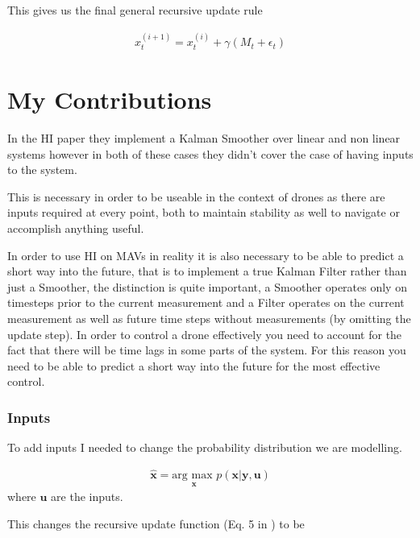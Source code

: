 \documentclass[]{../resources/final_report}
\begin{document}
This gives us the final general recursive update rule

\begin{align}
  x_t^{(i+1)} = x_t^{(i)} + \gamma (M_t + \epsilon_t)
\end{align}


\section{My Contributions}


In the HI paper they implement a Kalman Smoother over linear and non linear systems however in both of these cases
they didn't cover the case of having inputs to the system. 

This is necessary in order to be useable in the context of drones as there are inputs required at 
every point, both to maintain stability as well to navigate or accomplish anything useful.

In order to use HI on MAVs in reality it is also necessary to be able to predict a short way 
into the future, that is to implement a true Kalman Filter rather than just a Smoother, the distinction
is quite important, a Smoother operates only on timesteps prior to the current measurement and a Filter 
operates on the current measurement as well as future time steps without measurements (by omitting the update step). 
In order to control a drone effectively you need to account for the fact that there will be time lags in some 
parts of the system. For this reason you need to be able to predict a short way into the future for the most effective control.


\subsubsection{Inputs}

To add inputs I needed to change the probability distribution we are modelling.

\begin{align}
  \hat{\textbf{x}} = \underset{\textbf{x}}{\text{arg max }} p(\textbf{x} | \textbf{y}, \textbf{u}) 
\end{align}
where $\textbf{u}$ are the inputs.

This changes the recursive update function (Eq. 5 in \cite{Satorras2019CombiningGA}) to be 
\end{document}
